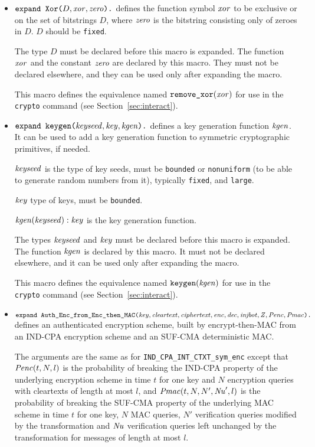 \documentclass{article}
\begin{document}
\begin{itemize}
\begin{itemize}
   \end{itemize}

\item $\texttt{expand\ Xor(}D, \mathit{xor}, \mathit{zero}\texttt{).}$ defines the
  function symbol $\mathit{xor}$ to be exclusive or on the set of
  bitstrings $D$, where $\mathit{zero}$ is the bitstring consisting only
  of zeroes in $D$. $D$ should be \texttt{fixed}.

  The type $D$ must be declared before this macro is expanded. The
  function $\mathit{xor}$ and the constant $\mathit{zero}$ are declared by
  this macro.  They must not be declared elsewhere, and they can be
  used only after expanding the macro.

   This macro defines the equivalence named $\texttt{remove\_xor}(\mathit{xor})$
   for use in the \texttt{crypto} command 
   (see Section~\ref{sec:interact}).

\item $\texttt{expand\ keygen(}\mathit{keyseed}, \mathit{key}, \mathit{kgen}\texttt{).}$
defines a key generation function $\mathit{kgen}$. It can be used to add a key
generation function to symmetric cryptographic primitives, if needed.

$\mathit{keyseed}$ is the type of key seeds, must be \texttt{bounded} or \texttt{nonuniform} (to be able to generate random numbers from it), typically \texttt{fixed}, and \texttt{large}.

$\mathit{key}$ type of keys, must be \texttt{bounded}.

$\mathit{kgen}(\mathit{keyseed}): \mathit{key}$ is the key generation function.

The types $\mathit{keyseed}$ and $\mathit{key}$ must be declared before this
macro is expanded. The function $\mathit{kgen}$ is declared by this
macro. It must not be declared elsewhere, and it can be used only
after expanding the macro.

This macro defines the equivalence named $\texttt{keygen}(\mathit{kgen})$
   for use in the \texttt{crypto} command 
   (see Section~\ref{sec:interact}).

\item
  $\texttt{expand\ Auth\_Enc\_from\_Enc\_then\_MAC(}\vn{key}, \vn{cleartext}, \vn{ciphertext}, \vn{enc}, \vn{dec}, \vn{injbot}, \vn{Z}, \vn{Penc}, \vn{Pmac}\texttt{).}$ defines an authenticated encryption scheme, built by encrypt-then-MAC from an IND-CPA encryption scheme and an SUF-CMA deterministic MAC.

  The arguments are the same as for \texttt{IND\_CPA\_INT\_CTXT\_sym\_enc} except that $\mathit{Penc}(t, N, l)$ is the probability of breaking the IND-CPA
  property of the underlying encryption scheme in time $t$ for one key and $N$ encryption queries with
  cleartexts of length at most $l$, and
  $\mathit{Pmac}(t, N, N', \mathit{Nu}', l)$ is the probability of breaking the SUF-CMA
   property of the underlying MAC scheme in time $t$ for one key, $N$ MAC queries, $N'$ verification
   queries modified by the transformation and $\mathit{Nu}$ verification
   queries left unchanged by the transformation for messages of length at most $l$.


\end{itemize}
\end{document}
